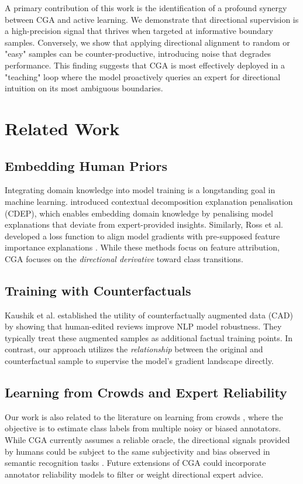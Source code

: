 \documentclass[sigconf,anonymous]{aamas}
\begin{document}
A primary contribution of this work is the identification of a profound synergy between CGA and active learning. We demonstrate that directional supervision is a high-precision signal that thrives when targeted at informative boundary samples. Conversely, we show that applying directional alignment to random or "easy" samples can be counter-productive, introducing noise that degrades performance. This finding suggests that CGA is most effectively deployed in a "teaching" loop where the model proactively queries an expert for directional intuition on its most ambiguous boundaries.

\section{Related Work}
\label{related_work}

\subsection{Embedding Human Priors}
Integrating domain knowledge into model training is a longstanding goal in machine learning. \citeauthor{rieger2020interpretations} \cite{rieger2020interpretations} introduced contextual decomposition explanation penalisation (CDEP), which enables embedding domain knowledge by penalising model explanations that deviate from expert-provided insights. Similarly, Ross et al. developed a loss function to align model gradients with pre-supposed feature importance explanations \cite{ross2017right}. While these methods focus on feature attribution, CGA focuses on the \emph{directional derivative} toward class transitions.

\subsection{Training with Counterfactuals}
Kaushik et al. \cite{Kaushik2020Learning} established the utility of counterfactually augmented data (CAD) by showing that human-edited reviews improve NLP model robustness. They typically treat these augmented samples as additional factual training points. In contrast, our approach utilizes the \emph{relationship} between the original and counterfactual sample to supervise the model's gradient landscape directly.

\subsection{Learning from Crowds and Expert Reliability}
Our work is also related to the literature on learning from crowds \cite{raykar10a}, where the objective is to estimate class labels from multiple noisy or biased annotators. While CGA currently assumes a reliable oracle, the directional signals provided by humans could be subject to the same subjectivity and bias observed in semantic recognition tasks \cite{malisiewicz2008recognition}. Future extensions of CGA could incorporate annotator reliability models to filter or weight directional expert advice.
\end{document}
